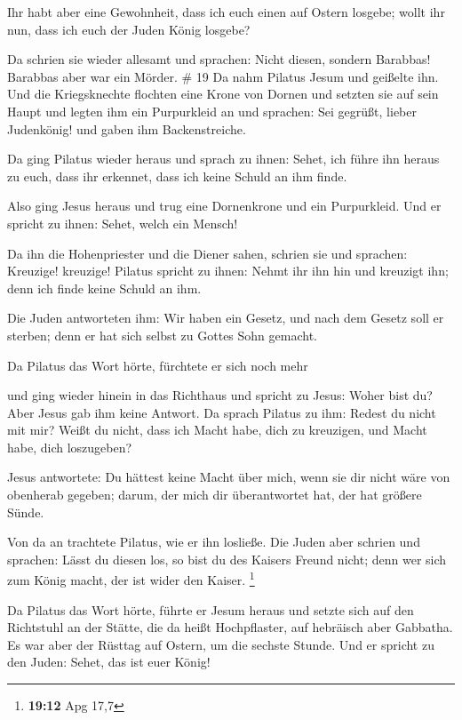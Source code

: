  Ihr habt aber eine Gewohnheit, dass ich euch einen auf
Ostern losgebe; wollt ihr nun, dass ich euch der Juden König losgebe?

 Da schrien sie wieder allesamt und sprachen: Nicht diesen,
sondern Barabbas! Barabbas aber war ein Mörder. \# 19  Da
nahm Pilatus Jesum und geißelte ihn.  Und die Kriegsknechte
flochten eine Krone von Dornen und setzten sie auf sein Haupt und legten
ihm ein Purpurkleid an  und sprachen: Sei gegrüßt, lieber
Judenkönig! und gaben ihm Backenstreiche.

 Da ging Pilatus wieder heraus und sprach zu ihnen: Sehet,
ich führe ihn heraus zu euch, dass ihr erkennet, dass ich keine Schuld
an ihm finde.

 Also ging Jesus heraus und trug eine Dornenkrone und ein
Purpurkleid. Und er spricht zu ihnen: Sehet, welch ein Mensch!

 Da ihn die Hohenpriester und die Diener sahen, schrien sie
und sprachen: Kreuzige! kreuzige! Pilatus spricht zu ihnen: Nehmt ihr
ihn hin und kreuzigt ihn; denn ich finde keine Schuld an ihm.

 Die Juden antworteten ihm: Wir haben ein Gesetz, und nach
dem Gesetz soll er sterben; denn er hat sich selbst zu Gottes Sohn
gemacht.

 Da Pilatus das Wort hörte, fürchtete er sich noch mehr

 und ging wieder hinein in das Richthaus und spricht zu
Jesus: Woher bist du? Aber Jesus gab ihm keine Antwort.  Da
sprach Pilatus zu ihm: Redest du nicht mit mir? Weißt du nicht, dass ich
Macht habe, dich zu kreuzigen, und Macht habe, dich loszugeben?

 Jesus antwortete: Du hättest keine Macht über mich, wenn
sie dir nicht wäre von obenherab gegeben; darum, der mich dir
überantwortet hat, der hat größere Sünde.

 Von da an trachtete Pilatus, wie er ihn losließe. Die
Juden aber schrien und sprachen: Lässt du diesen los, so bist du des
Kaisers Freund nicht; denn wer sich zum König macht, der ist wider den
Kaiser. \footnote{\textbf{19:12} Apg 17,7}

 Da Pilatus das Wort hörte, führte er Jesum heraus und
setzte sich auf den Richtstuhl an der Stätte, die da heißt Hochpflaster,
auf hebräisch aber Gabbatha.  Es war aber der Rüsttag auf
Ostern, um die sechste Stunde. Und er spricht zu den Juden: Sehet, das
ist euer König!

